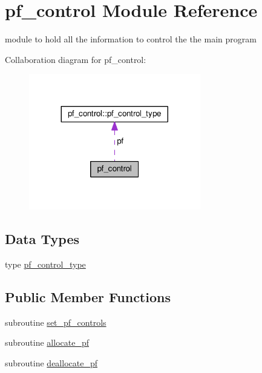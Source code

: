 \hypertarget{classpf__control}{\section{pf\-\_\-control Module Reference}
\label{classpf__control}
}


module to hold all the information to control the the main program  




Collaboration diagram for pf\-\_\-control\-:\nopagebreak
\begin{figure}[H]
\begin{center}
\leavevmode
\includegraphics[width=212pt]{classpf__control__coll__graph}
\end{center}
\end{figure}
\subsection*{Data Types}
\begin{DoxyCompactItemize}
\item 
type \hyperlink{structpf__control_1_1pf__control__type}{pf\-\_\-control\-\_\-type}
\end{DoxyCompactItemize}
\subsection*{Public Member Functions}
\begin{DoxyCompactItemize}
\item 
subroutine \hyperlink{classpf__control_a51d23c79a8d8c8990693e6a3c3fd677d}{set\-\_\-pf\-\_\-controls}
\item 
subroutine \hyperlink{classpf__control_ac9178a97a8f6b9e8065f85c3ed790104}{allocate\-\_\-pf}
\item 
subroutine \hyperlink{classpf__control_a27e74873fa25af0939a3f824954857f4}{deallocate\-\_\-pf}
\end{DoxyCompactItemize}
